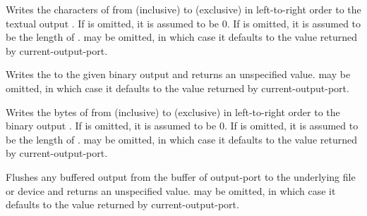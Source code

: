 \begin{entry}{%
}

Writes the characters of 
from  (inclusive) to  (exclusive)
in left-to-right order to the
textual output .
If  is omitted, it is assumed to be 0.
If  is omitted, it is assumed to be the length of .
 may be
omitted, in which case it defaults to the value returned by {\cf
  current-output-port}.

\end{entry}

\begin{entry}{%
}

Writes the  to
the given binary output  and returns an unspecified value.
 may be omitted, in which case it defaults to
the value returned by {\cf current-output-port}.

\end{entry}

\begin{entry}{%
}

Writes the bytes of 
from  (inclusive) to  (exclusive)
in left-to-right order to the
binary output .
If  is omitted, it is assumed to be 0.
If  is omitted, it is assumed to be the length of .
 may be
omitted, in which case it defaults to the value returned by {\cf
  current-output-port}.

\end{entry}

\begin{entry}{%
}

Flushes any buffered output from the buffer of output-port to the
underlying file or device and returns an unspecified value.
 may be omitted, in which case it defaults to
the value returned by {\cf current-output-port}.

\end{entry}


